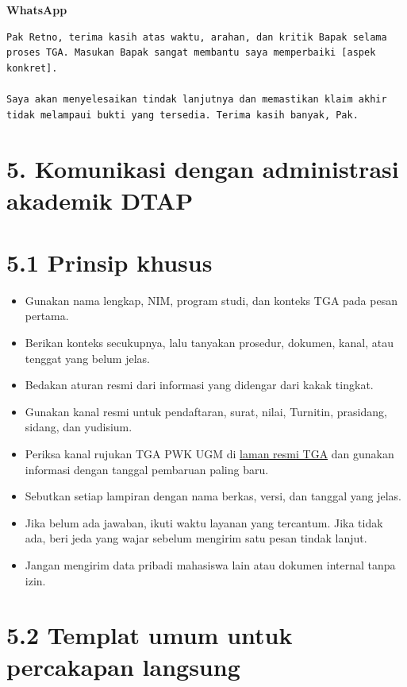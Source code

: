 \documentclass[
  indonesian,
]{article}
\providecommand{\tightlist}{%
  \setlength{\itemsep}{0pt}\setlength{\parskip}{0pt}}
\renewcommand{\subsection}{\section}
\begin{document}
\textbf{WhatsApp}

\begin{verbatim}
Pak Retno, terima kasih atas waktu, arahan, dan kritik Bapak selama proses TGA. Masukan Bapak sangat membantu saya memperbaiki [aspek konkret].

Saya akan menyelesaikan tindak lanjutnya dan memastikan klaim akhir tidak melampaui bukti yang tersedia. Terima kasih banyak, Pak.
\end{verbatim}

\section{5. Komunikasi dengan administrasi akademik
DTAP}\label{komunikasi-dengan-administrasi-akademik-dtap}

\subsection{5.1 Prinsip khusus}\label{prinsip-khusus}

\begin{itemize}
\tightlist
\item
  Gunakan nama lengkap, NIM, program studi, dan konteks TGA pada pesan
  pertama.
\item
  Berikan konteks secukupnya, lalu tanyakan prosedur, dokumen, kanal,
  atau tenggat yang belum jelas.
\item
  Bedakan aturan resmi dari informasi yang didengar dari kakak tingkat.
\item
  Gunakan kanal resmi untuk pendaftaran, surat, nilai, Turnitin,
  prasidang, sidang, dan yudisium.
\item
  Periksa kanal rujukan TGA PWK UGM di
  \href{https://sites.google.com/ugm.ac.id/tgapwkugm}{laman resmi TGA}
  dan gunakan informasi dengan tanggal pembaruan paling baru.
\item
  Sebutkan setiap lampiran dengan nama berkas, versi, dan tanggal yang
  jelas.
\item
  Jika belum ada jawaban, ikuti waktu layanan yang tercantum. Jika tidak
  ada, beri jeda yang wajar sebelum mengirim satu pesan tindak lanjut.
\item
  Jangan mengirim data pribadi mahasiswa lain atau dokumen internal
  tanpa izin.
\end{itemize}

\subsection{5.2 Templat umum untuk percakapan
langsung}\label{templat-umum-untuk-percakapan-langsung}
\end{document}
